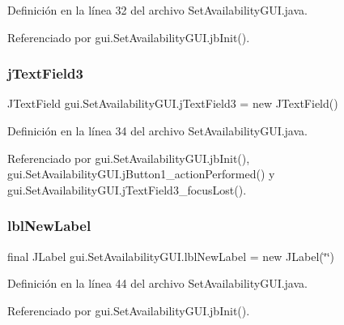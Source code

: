 Definición en la línea 32 del archivo Set\+Availability\+G\+U\+I.\+java.



Referenciado por gui.\+Set\+Availability\+G\+U\+I.\+jb\+Init().

\mbox{\label{classgui_1_1_set_availability_g_u_i_a6a62e691d6ed16e056c13d321e077d00}} 
\subsubsection{\texorpdfstring{jTextField3}{jTextField3}}
{\footnotesize\ttfamily J\+Text\+Field gui.\+Set\+Availability\+G\+U\+I.\+j\+Text\+Field3 = new J\+Text\+Field()\hspace{0.3cm}{\ttfamily [private]}}



Definición en la línea 34 del archivo Set\+Availability\+G\+U\+I.\+java.



Referenciado por gui.\+Set\+Availability\+G\+U\+I.\+jb\+Init(), gui.\+Set\+Availability\+G\+U\+I.\+j\+Button1\+\_\+action\+Performed() y gui.\+Set\+Availability\+G\+U\+I.\+j\+Text\+Field3\+\_\+focus\+Lost().

\mbox{\label{classgui_1_1_set_availability_g_u_i_a1f6f638242c97025fc857440f6669918}} 
\subsubsection{\texorpdfstring{lblNewLabel}{lblNewLabel}}
{\footnotesize\ttfamily final J\+Label gui.\+Set\+Availability\+G\+U\+I.\+lbl\+New\+Label = new J\+Label(\char`\"{}\char`\"{})\hspace{0.3cm}{\ttfamily [private]}}



Definición en la línea 44 del archivo Set\+Availability\+G\+U\+I.\+java.



Referenciado por gui.\+Set\+Availability\+G\+U\+I.\+jb\+Init().

\mbox{\label{classgui_1_1_set_availability_g_u_i_a02f2fb2b0ea2556d734c4f066d396f44}} 
